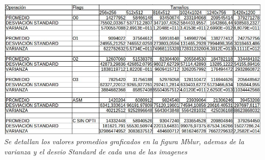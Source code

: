 \documentclass[a4paper]{article}
\begin{document}
\includegraphics[width=\textwidth,height=\textheight,keepaspectratio
]{valoresmblur.jpg}
\textit{Se detallan los valores promedios graficados en la figura Mblur, ademas de la varianza y el desvio Standard de cada una de las imagenes}\newline \newline
\end{document}
